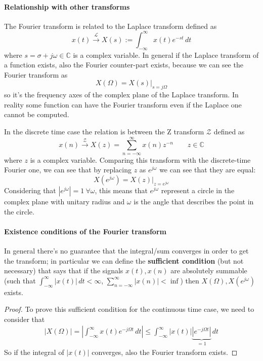 	\paragraph{Relationship with other transforms} The Fourier transform is related to the Laplace transform defined as
	\[x(t) \xrightarrow{\mathscr{L}} X(s) := \int_{-\infty}^\infty x(t) e^{-st} \, dt \]
	where $s = \sigma + j\omega \in \mathds C$ is a complex variable. In general if the Laplace transform of a function exists, also the Fourier counter-part exists, because we can see the Fourier transform as
	\[ X(\Omega) = X(s) \big|_{s = j\Omega} \]
	so it's the frequency axes of the complex plane of the Laplace transform. In reality some function can have the Fourier transform even if the Laplace one cannot be computed.
	
	In the discrete time case the relation is between the Z transform $\mathscr{Z}$ defined as
	\[x(n) \xrightarrow{\mathscr{Z}} X(z) = \sum_{n=-\infty}^{\infty} x(n) z^{-n}  \qquad z \in \mathds C \]
	where $z$ is a complex variable. Comparing this transform with the discrete-time Fourier one, we can see that by replacing $z$ as $e^{j\omega}$ we can see that they are equal:
	\[ X\left(e^{j\omega} \right) = X(z) \big|_{z = e^{j\omega}}\]
	Considering that $|e^{j\omega}| = 1 \ \forall \omega$, this means that $e^{j\omega}$ represent a circle in the complex plane with unitary radius and $\omega$ is the angle that describes the point in the circle.
	
	\paragraph{Existence conditions of the Fourier transform} In general there's no guarantee that the integral/sum converges in order to get the transform; in particular we can define the \textbf{sufficient condition} (but not necessary) that says that if the signals $x(t), x(n)$ are absolutely summable (such that $\int_{-\infty}^\infty |x(t)|\, dt < \infty$, $\sum_{n=-\infty}^\infty |x(n)| < \inf $) then $X(\Omega), X(e^{j\omega})$ exists.
	\begin{proof}
		To prove this sufficient condition for the continuous time case, we need to consider that
		\begin{align*}
			|X(\Omega)| = \left| \int_{-\infty}^\infty x(t) e^{-j\Omega t}\, dt \right| \leq \int_{-\infty}^\infty |x(t)|\underbrace{ \left|e^{-j\Omega t}\right|}_{=1} \, dt
		\end{align*}
		So if the integral of $|x(t)|$ converges, also the Fourier transform exists.
	\end{proof}
	
